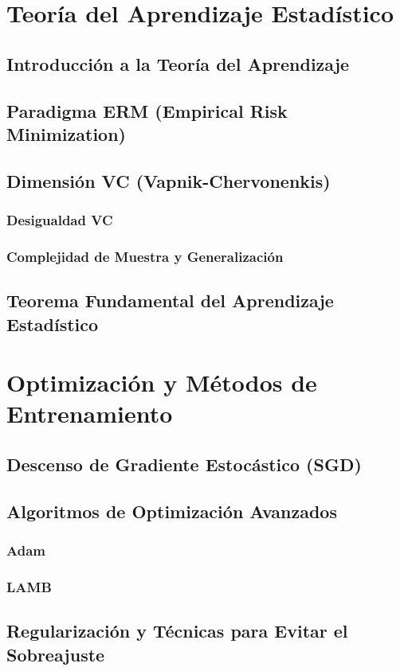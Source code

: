 \section{Teoría del Aprendizaje Estadístico}
\subsection{Introducción a la Teoría del Aprendizaje}
\subsection{Paradigma ERM (Empirical Risk Minimization)}
\subsection{Dimensión VC (Vapnik-Chervonenkis)}
\subsubsection{Desigualdad VC}
\subsubsection{Complejidad de Muestra y Generalización}
\subsection{Teorema Fundamental del Aprendizaje Estadístico}

\section{Optimización y Métodos de Entrenamiento}
\subsection{Descenso de Gradiente Estocástico (SGD)}
\subsection{Algoritmos de Optimización Avanzados}
\subsubsection{Adam}
\subsubsection{LAMB}
\subsection{Regularización y Técnicas para Evitar el Sobreajuste}
